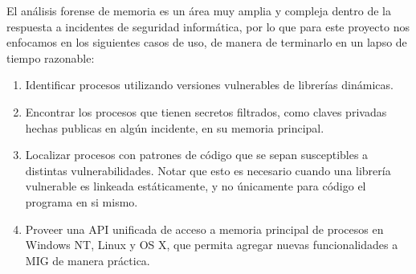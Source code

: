 El análisis forense de memoria es un área muy amplia y compleja dentro de la
respuesta a incidentes de seguridad informática, por lo que para este proyecto
nos enfocamos en los siguientes casos de uso, de manera de terminarlo en un
lapso de tiempo razonable:

\begin{enumerate}

\item Identificar procesos utilizando versiones vulnerables de librerías
    dinámicas.

\item Encontrar los procesos que tienen secretos filtrados, como claves
    privadas hechas publicas en algún incidente, en su memoria principal.

\item Localizar procesos con patrones de código que se sepan susceptibles a
    distintas vulnerabilidades. Notar que esto es necesario cuando una librería
    vulnerable es linkeada estáticamente, y no únicamente para código el
    programa en si mismo.

\item Proveer una API unificada de acceso a memoria principal de procesos en
    Windows NT, Linux y OS X, que permita agregar nuevas funcionalidades a MIG
    de manera práctica.

\end{enumerate}
